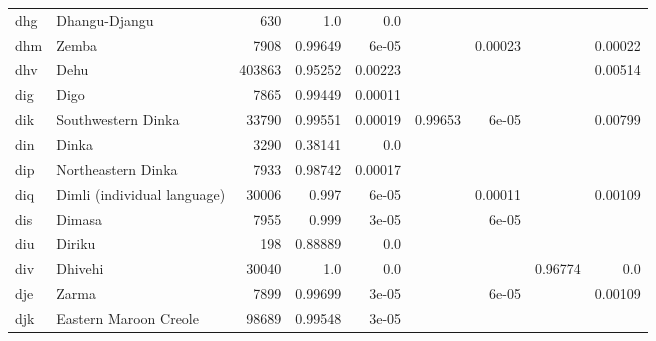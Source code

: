 \documentclass[11pt]{article}
\begin{document}
\begin{table*}[h]
{\begin{tabular}{llrrrrrrr}
dhg         & Dhangu-Djangu         & 630         & 1.0         & 0.0         &          &          &          &          \\

dhm         & Zemba         & 7908         & 0.99649         & 6e-05         &          & 0.00023         &          & 0.00022         \\

dhv         & Dehu         & 403863         & 0.95252         & 0.00223         &          &          &          & 0.00514         \\

dig         & Digo         & 7865         & 0.99449         & 0.00011         &          &          &          &          \\

dik         & Southwestern Dinka         & 33790         & 0.99551         & 0.00019         & 0.99653         & 6e-05         &          & 0.00799         \\

din         & Dinka         & 3290         & 0.38141         & 0.0         &          &          &          &          \\

dip         & Northeastern Dinka         & 7933         & 0.98742         & 0.00017         &          &          &          &          \\

diq         & Dimli (individual language)         & 30006         & 0.997         & 6e-05         &          & 0.00011         &          & 0.00109         \\

dis         & Dimasa         & 7955         & 0.999         & 3e-05         &          & 6e-05         &          &          \\

diu         & Diriku         & 198         & 0.88889         & 0.0         &          &          &          &          \\

div         & Dhivehi         & 30040         & 1.0         & 0.0         &          &          & 0.96774         & 0.0         \\

dje         & Zarma         & 7899         & 0.99699         & 3e-05         &          & 6e-05         &          & 0.00109         \\

djk         & Eastern Maroon Creole         & 98689         & 0.99548         & 3e-05         &          &          &          &          \\


\end{tabular}}
\end{table*}
\end{document}
